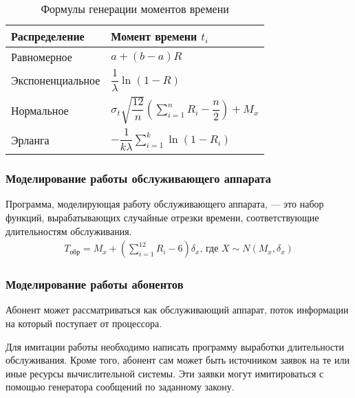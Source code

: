 \begin{table}[H]
    \renewcommand{\arraystretch}{1.5}
    \caption{Формулы генерации моментов времени}
    \begin{tabularx}{\textwidth} {
            >{\raggedright\arraybackslash}X
            >{\centering\arraybackslash}X}
        \toprule
        \textbf{Распределение} & \textbf{Момент времени $t_i$}                                                                \\
        \midrule
        Равномерное            & ${a + (b - a)R}$                                                                             \\
        Экспоненциальное       & ${\dfrac{1}{\lambda}\ln(1 - R)}$                                                             \\
        Нормальное             & ${\sigma_t\sqrt{\dfrac{12}{n}}}\left(\sum\limits_{i = 1}^n R_i - \dfrac{n}{2} \right) + M_x$ \\
        Эрланга                & ${-\dfrac{1}{k\lambda}}\sum\limits_{i=1}^k\ln(1-R_i)$                                        \\
        \bottomrule
    \end{tabularx}
\end{table}

\subsubsection{Моделирование работы обслуживающего аппарата}

Программа, моделирующая работу обслуживающего аппарата, --- это набор функций, вырабатывающих случайные отрезки времени, соответствующие длительностям обслуживания.
%
\begin{gather*}
    T_{\text{обр}} = M_x + \left(\sum\limits_{i = 1}^{12}R_i - 6\right)\delta_x,\,\text{где } X\sim N(M_x, \delta_x)
\end{gather*}
%

\subsubsection{Моделирование работы абонентов}

Абонент может рассматриваться как обслуживающий аппарат, поток информации на который поступает от процессора.

Для имитации работы необходимо написать программу выработки длительности обслуживания. Кроме того, абонент сам может быть источником заявок на те или иные ресурсы вычислительной системы. Эти заявки могут имитироваться с помощью генератора сообщений по заданному закону.

